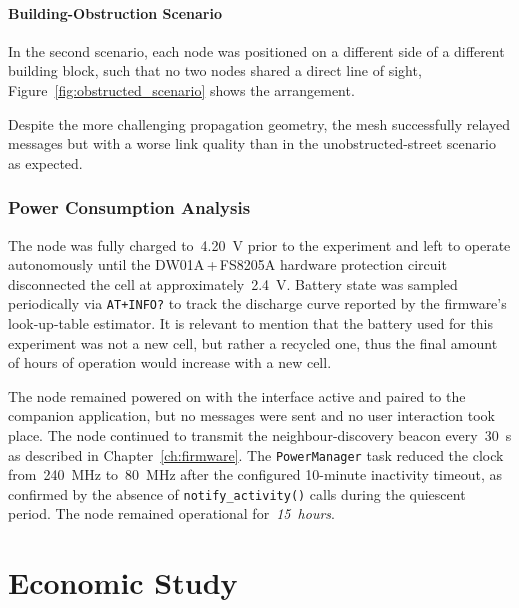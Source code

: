 \documentclass[english,bachelor]{tfgitic}[2026/01/22]
\begin{document}
\subsubsection{Building-Obstruction Scenario}

In the second scenario, each node was positioned on a different side of a different building block, such that no two nodes shared a direct line of sight, Figure~\ref{fig:obstructed_scenario} shows the arrangement.



Despite the more challenging propagation geometry, the mesh successfully relayed messages but with a worse link quality than in the unobstructed-street scenario as expected.

\newpage
\subsection{Power Consumption Analysis}
\label{sec:results_power}

The node was fully charged to~4.20~V prior to the experiment and left to operate autonomously until the DW01A\,+\,FS8205A hardware protection circuit disconnected the cell at approximately~2.4~V. Battery state was sampled periodically via \texttt{AT+INFO?} to track the discharge curve reported by the firmware's look-up-table estimator. It is relevant to mention that the battery used for this experiment was not a new cell, but rather a recycled one, thus the final amount of hours of operation would increase with a new cell. 

The node remained powered on with the  interface active and paired to the companion application, but no messages were sent and no user interaction took place. The node continued to transmit the neighbour-discovery beacon every~30~s as described in Chapter~\ref{ch:firmware}. The \texttt{PowerManager} task reduced the  clock from~240~MHz to~80~MHz after the configured 10-minute inactivity timeout, as confirmed by the absence of \texttt{notify\_activity()} calls during the quiescent period. The node remained operational for~\emph{15~hours}.
\chapter{Economic Study}
\label{ch:costs}
\end{document}
